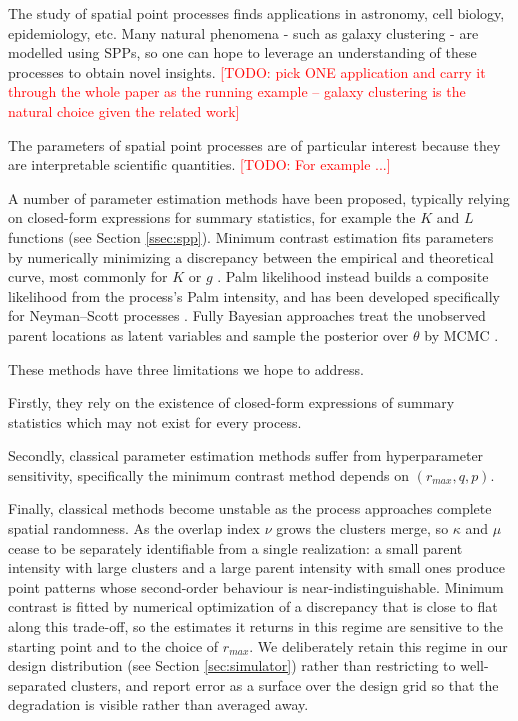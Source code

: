 \documentclass[11pt,letterpaper]{article}
\newcommand{\1}{\mathds{1}}
\newcommand{\todo}[1]{\textcolor{red}{[TODO: #1]}}
\newcommand{\fix}[1]{\textcolor{blue}{[FIX: #1]}}
\newcommand{\todo}[1]{}\newcommand{\fix}[1]{}
\theoremstyle{plain}
\theoremstyle{definitioncolon}
\begin{document}
The study of spatial point processes finds applications in astronomy, cell
biology, epidemiology, etc. Many natural phenomena - such as galaxy clustering -
are modelled using SPPs, so one can hope to leverage an understanding of these
processes to obtain novel insights.
\todo{pick ONE application and carry it through the whole paper as the running
example -- galaxy clustering is the natural choice given the related work}

The parameters of spatial point processes are of particular interest because 
they are interpretable scientific quantities.
\todo{For example ...}


A number of parameter estimation methods have been proposed, typically relying
on closed-form expressions for summary statistics, for example the $K$ and $L$
functions (see Section \ref{ssec:spp}). Minimum contrast estimation fits parameters by numerically
minimizing a discrepancy between the empirical and theoretical curve, most
commonly for $K$ or $g$ \citep{diggle2003spatial}. Palm likelihood instead
builds a composite likelihood from the process's Palm intensity, and has been
developed specifically for Neyman--Scott processes \citep{tanaka2008parameter}.
Fully Bayesian approaches treat the unobserved parent locations as latent
variables and sample the posterior over $\theta$ by MCMC
\citep{moller2004statistical}.

These methods have three limitations we hope to address.

Firstly, they rely on the existence of closed-form expressions of
summary statistics which may not exist for every process.

Secondly, classical parameter estimation methods suffer from 
hyperparameter sensitivity, specifically the minimum contrast method
depends on $(r_{max}, q, p)$. 

Finally, classical methods become unstable as the process approaches complete
spatial randomness. As the overlap index $\nu$ grows the clusters merge, so
$\kappa$ and $\mu$ cease to be separately identifiable from a single
realization: a small parent intensity with large clusters and a large parent
intensity with small ones produce point patterns whose second-order behaviour is
near-indistinguishable. Minimum contrast is fitted by numerical optimization of
a discrepancy that is close to flat along this trade-off, so the estimates it
returns in this regime are sensitive to the starting point and to the choice of
$r_{max}$. We deliberately retain this regime in our design distribution (see
Section \ref{sec:simulator}) rather than restricting to well-separated clusters,
and report error as a surface over the design grid so that the degradation is
visible rather than averaged away.
\end{document}
